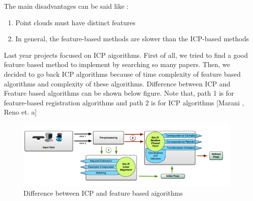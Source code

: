 \documentclass[aps,letterpaper,11pt]{revtex4}
\begin{document}
The main disadvantages can be said like :
\begin{enumerate}
\item Point clouds  must have distinct features
\item In general, the feature-based methods are slower than
the ICP-based methods
\end{enumerate}
Last year projects focused on ICP aigorithms. First of all, we tried to find a good feature based method to implement by searching so many papers. Then, we decided to go back ICP algorithms because of time complexity of feature based algorithms and complexity of these algorithms. Difference between ICP and Feature based algorithms can be shown below figure. Note that, path 1 is for feature-based registration algorithms and path 2 is for ICP algorithms  [Marani , Reno et. a]


\begin{figure}[H]
	\centering
	\includegraphics[width=15cm]{icpvsfe.png}
	\caption{Difference between ICP and feature based aigorithms}

\end{figure}
\end{document}
